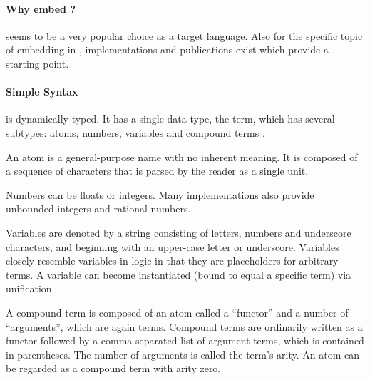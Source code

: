 \documentclass[thesis-solanki.tex]{subfiles}
\begin{document}
\paragraph{Why embed  ?}

\begin{comment}
Existing implementations

As a starting point a few publications and implementations helped in exploring the topic. The shortcomings were clearly visible to work and
improve upon giving a starting point.
\end{comment}

 seems to be a very popular choice as a target language. Also for the specific topic of embedding  in 
, implementations and publications exist which provide a starting point.


\paragraph{Simple Syntax}

 is dynamically typed. It has a single data type, the term, which has several subtypes: atoms, numbers, variables and 
compound terms \cite{wikiprolog}.


An atom is a general-purpose name with no inherent meaning. It is composed of a sequence of characters that is parsed by the 
 reader as a single unit.

Numbers can be floats or integers. Many  implementations also provide unbounded integers and rational numbers.

Variables are denoted by a string consisting of letters, numbers and underscore characters, and beginning with an upper-case letter or 
underscore. Variables closely resemble variables in logic in that they are placeholders for arbitrary terms. A variable can become 
instantiated (bound to equal a specific term) via unification.

A compound term is composed of an atom called a ``functor'' and a number of ``arguments'', which are again terms. Compound terms are 
ordinarily written as a functor followed by a comma-separated list of argument terms, which is contained in parentheses. The number of 
arguments is called the term's arity. An atom can be regarded as a compound term with arity zero.
\end{document}
